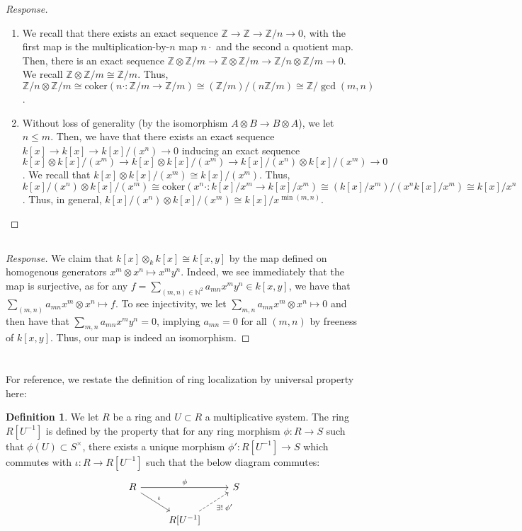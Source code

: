 \documentclass[english]{article}
\newcommand{\NN}{\mathbb{N}}
\newcommand{\ZZ}{\mathbb{Z}}
\newcommand{\prob}[1]{\setcounter{section}{#1-1}\section{}}
\newcommand{\prt}[1]{\setcounter{subsection}{#1-1}\subsection{}}
\theoremstyle{remark}
\theoremstyle{definition}
\newtheorem{definition}[theorem]{Definition}
\newcommand{\coker}{\mathrm{coker}}
\begin{document}
\begin{proof}[Response]~
	\begin{enumerate}[label=\emph{(\roman*)}]
		\item We recall that there exists an exact sequence $\ZZ\to\ZZ\to\ZZ/n\to 0$, with the first map is the multiplication-by-$n$ map $n\cdot$ and the second a quotient map. Then, there is an exact sequence $\ZZ\otimes \ZZ/m\to \ZZ\otimes \ZZ/m\to \ZZ/n\otimes \ZZ/m\to 0$. We recall $\ZZ\otimes \ZZ/m\cong \ZZ/m$. Thus, $\ZZ/n\otimes \ZZ/m\cong \coker(n\cdot: \ZZ/m\to\ZZ/m)\cong (\ZZ/m)/(n\ZZ/m)\cong \ZZ/\gcd(m,n)$.
		
		\item Without loss of generality (by the isomorphism $A\otimes B\to B\otimes A$), we let $n\leq m$. Then, we have that there exists an exact sequence $k[x]\to k[x]\to k[x]/(x^n)\to 0$ inducing an exact sequence $k[x]\otimes k[x]/(x^m)\to k[x]\otimes k[x]/(x^m)\to k[x]/(x^n)\otimes k[x]/(x^m)\to0$. We recall that $k[x]\otimes k[x]/(x^m)\cong k[x]/(x^m)$. Thus, $k[x]/(x^n)\otimes k[x]/(x^m)\cong \coker(x^n\cdot:k[x]/x^m\to k[x]/x^m)\cong (k[x]/x^m)/(x^nk[x]/x^m)\cong k[x]/x^n$. Thus, in general,  $k[x]/(x^n)\otimes k[x]/(x^m)\cong k[x]/x^{\min(m,n)}$.
	\end{enumerate}
\end{proof}
\prt{3}
\begin{proof}[Response]
We claim that $k[x]\otimes_k k[x]\cong k[x,y]$ by the map defined on homogenous generators  $x^m\otimes x^n\mapsto x^my^n$. Indeed, we see immediately that the map is surjective, as for any $f=\sum_{(m,n)\in \NN^2}a_{mn}x^my^n\in k[x,y]$, we have that $\sum_{(m,n)}a_{mn}x^m\otimes x^n\mapsto  f$. To see injectivity, we let $\sum_{m,n}a_{mn}x^m\otimes x^n\mapsto 0$ and then have that $\sum_{m,n} a_{mn}x^my^n=0$, implying $a_{mn}=0$ for all $(m,n)$ by freeness of $k[x,y]$. Thus, our map is indeed an isomorphism. 
\end{proof}
%
%
%
\prob{5}
For reference, we restate the definition of ring localization by universal property here:
\begin{definition}
	\label{def:local} We let $R$ be a ring and $U\subset R$ a multiplicative system. The ring $R[U^{-1}]$ is defined by the property that for any ring morphism $\phi: R\to S$ such that $\phi(U)\subset S^\times$, there exists a unique morphism $\phi':R[U^{-1}]\to S$ which commutes with $\iota: R\to R[U^{-1}]$ such that the below diagram commutes:
$$
\begin{tikzcd}
	R \arrow[rd,"\iota"] \arrow[rr, "\phi"]& & S \\
	& R[U^{-1}]\arrow[ru,dashrightarrow,swap,"\exists!\;\phi'"]
\end{tikzcd}
$$

\end{definition}
\end{document}
